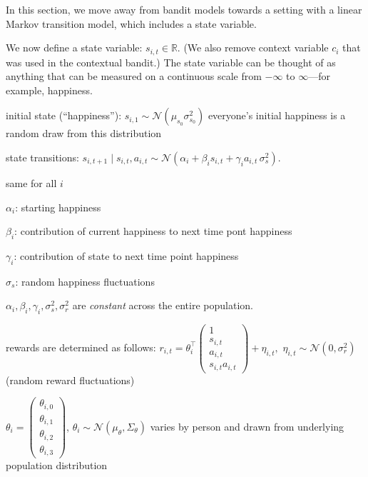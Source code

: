 
In this section, we move away from bandit models towards a setting with a linear Markov transition model, which includes a state variable. 


We now define a state variable: $s_{i,t} \in \mathbb{R}$. (We also remove context variable $c_i$ that was used in the contextual bandit.) The state variable can be thought of as anything that can be measured on a continuous scale from $-\infty$ to $\infty$—for example, happiness. 

initial state (\enquote{happiness}): $s_{i,1} \sim \mathcal{N}(\mu_{s_0} \sigma_{s_0}^2)$ everyone's initial happiness is a random draw from this distribution

state transitions: $s_{i,t+1} \mid s_{i,t}, a_{i,t}
\sim
\mathcal{N}
\left(
\alpha_i + \beta_i s_{i,t} + \gamma_i a_{i,t}
\,
\sigma_s^2
\right).$



same for all $i$

$\alpha_{i}$: starting happiness

$\beta_{i}$: contribution of current happiness to next time pont happiness

$\gamma_{i}$: contribution of state to next time point happiness

$\sigma_{s}$: random happiness fluctuations

$\alpha_i, \beta_i, \gamma_i, \sigma^2_s, \sigma^2_r$ are \textit{constant} across the entire population.

rewards are determined as follows: 
$r_{i,t}
=
\theta_i^\top
\begin{pmatrix}
1\\
s_{i,t}\\
a_{i,t}\\
s_{i,t}a_{i,t}
\end{pmatrix}
+
\eta_{i,t}, $ $\eta_{i,t} \sim \mathcal{N}(0,\sigma_r^2)$ (random reward fluctuations)

$\theta_i =
\begin{pmatrix}
\theta_{i,0} \\
\theta_{i,1} \\
\theta_{i,2} \\
\theta_{i,3}
\end{pmatrix}$, $\theta_i \sim \mathcal N(\mu_\theta,\Sigma_\theta)$ varies by person and drawn from underlying population distribution

